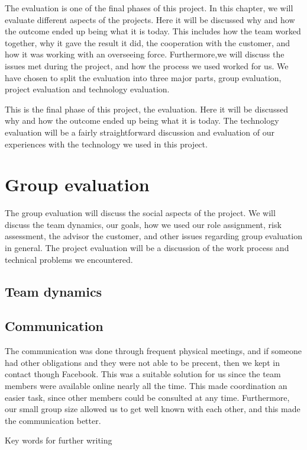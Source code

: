 The evaluation is one of the final phases of this project. In this chapter, we will evaluate different aspects of the projects. 
Here it will be discussed why and how the outcome ended up being what it is today.
This includes how the team worked together, why it gave the result it did, the cooperation with the customer, and how it was working with an overseeing force. Furthermore,we will discuss the issues met during the project, and how the process we used worked for us.
We have chosen to split the evaluation into three major parts, group evaluation, project evaluation and technology evaluation. 
 
 
This is the final phase of this project, the evaluation. Here it will be discussed why and how the outcome
ended up being what it is today.  
The technology evaluation will be a fairly straightforward discussion and evaluation of our experiences with the technology we used in this project.
\section{Group evaluation}
The group evaluation will discuss the social aspects of the project. 
We will discuss the team dynamics, our goals, how we used our role assignment, risk assessment, the advisor the customer, and other issues regarding group evaluation in general.
The project evaluation will be a discussion of the work process and technical problems we encountered.

\subsection{Team dynamics}

\subsection{Communication}
The communication was done through frequent physical meetings, and if someone had other obligations and they were not able to be precent, then we kept in contact though Facebook. This was a suitable solution for us since the team members were available online nearly all the time. 
This made coordination an easier task, since other members could be consulted at any time. 
Furthermore, our small group size allowed us to get well known with each other, and this made the communication better.

Key words for further writing

